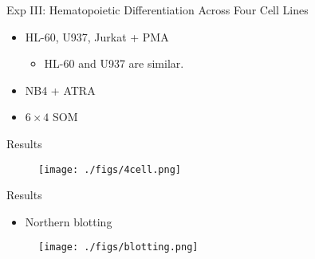 \begin{frame}{Exp III: Hematopoietic Differentiation Across Four Cell Lines}
    \begin{itemize}
        \item HL-60, U937, Jurkat + PMA
              \begin{itemize}
                  \item HL-60 and U937 are similar.
              \end{itemize}
        \item NB4 + ATRA
        \item $6\times 4$ SOM
    \end{itemize}
\end{frame}

\begin{frame}{Results}
    \begin{figure}
        \begin{minipage}[b]{0.48\linewidth}
            \centering
            \texttt{[image: ./figs/4cell.png]}
        \end{minipage}
        \begin{minipage}[b]{0.48\linewidth}
            \centering
        \end{minipage}
    \end{figure}
\end{frame}

\begin{frame}{Results}
    \begin{itemize}
        \item Northern blotting
    \end{itemize}
    \begin{figure}
        \centering
        \texttt{[image: ./figs/blotting.png]}
    \end{figure}
\end{frame}

% 
